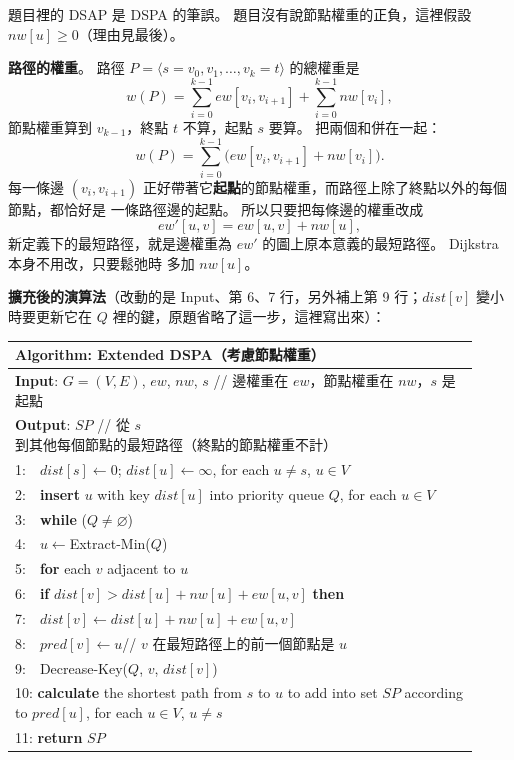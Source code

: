 \begin{pastsoln}
題目裡的 DSAP 是 DSPA 的筆誤。 題目沒有說節點權重的正負，這裡假設 $nw[u] \ge 0$（理由見最後）。

\textbf{路徑的權重}。 路徑 $P = \langle s = v_0, v_1, \ldots, v_k = t\rangle$ 的總權重是
\[
w(P) = \sum_{i=0}^{k-1} ew[v_i, v_{i+1}] + \sum_{i=0}^{k-1} nw[v_i],
\]
節點權重算到 $v_{k-1}$，終點 $t$ 不算，起點 $s$ 要算。 把兩個和併在一起：
\[
w(P) = \sum_{i=0}^{k-1} \bigl(ew[v_i, v_{i+1}] + nw[v_i]\bigr).
\]
每一條邊 $(v_i, v_{i+1})$ 正好帶著它\textbf{起點}的節點權重，而路徑上除了終點以外的每個節點，都恰好是
一條路徑邊的起點。 所以只要把每條邊的權重改成
\[
ew'[u, v] = ew[u, v] + nw[u],
\]
新定義下的最短路徑，就是邊權重為 $ew'$ 的圖上原本意義的最短路徑。 Dijkstra 本身不用改，只要鬆弛時
多加 $nw[u]$。

\textbf{擴充後的演算法}（改動的是 Input、第 6、7 行，另外補上第 9 行；$dist[v]$ 變小時要更新它在
$Q$ 裡的鍵，原題省略了這一步，這裡寫出來）：
\begin{center}
\small
\begin{tabular}{|p{0.92\linewidth}|}
\hline
\textbf{Algorithm}: Extended DSPA（考慮節點權重）\\ \hline
\textbf{Input}: $G=(V, E)$, $ew$, $nw$, $s$ \quad // 邊權重在 $ew$，節點權重在 $nw$，$s$ 是起點\\
\textbf{Output}: $SP$ \quad // 從 $s$ 到其他每個節點的最短路徑（終點的節點權重不計）\\ \hline
1:\ \ $dist[s]\leftarrow 0$; $dist[u]\leftarrow\infty$, for each $u\neq s$, $u\in V$\\
2:\ \ \textbf{insert} $u$ with key $dist[u]$ into priority queue $Q$, for each $u\in V$\\
3:\ \ \textbf{while} ($Q\neq\varnothing$)\\
4:\ \ \hspace*{1.5em}$u\leftarrow$Extract-Min($Q$)\\
5:\ \ \hspace*{1.5em}\textbf{for} each $v$ adjacent to $u$\\
6:\ \ \hspace*{3em}\textbf{if} $dist[v] > dist[u]+nw[u]+ew[u,v]$ \textbf{then}\\
7:\ \ \hspace*{4.5em}$dist[v]\leftarrow dist[u]+nw[u]+ew[u,v]$\\
8:\ \ \hspace*{4.5em}$pred[v]\leftarrow u$\quad // $v$ 在最短路徑上的前一個節點是 $u$\\
9:\ \ \hspace*{4.5em}Decrease-Key($Q$, $v$, $dist[v]$)\\
10: \textbf{calculate} the shortest path from $s$ to $u$ to add into set $SP$ according to $pred[u]$, for each $u\in V$, $u\neq s$\\
11: \textbf{return} $SP$\\ \hline
\end{tabular}
\end{center}


\end{pastsoln}
